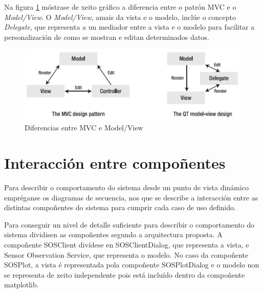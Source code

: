Na figura \ref{fig:MVCvsMV} móstrase de xeito gráfico a diferencia entre o patrón MVC e o \emph{Model/View}. O \emph{Model/View}, amais da vista e o modelo, inclúe o concepto \emph{Delegate}, que representa a un mediador entre a vista e o modelo para facilitar a personalización de como se mostran e editan determinados datos.

\begin{figure}[hbtp]
 \centering
 \includegraphics[width=\textwidth]{images/MVCvsMV.png}
 \caption{Diferencias entre MVC e Model/View}
 \label{fig:MVCvsMV}
\end{figure}

\section{Interacción entre compoñentes}
Para describir o comportamento do sistema desde un punto de vista dinámico empréganse os diagramas de secuencia, nos que se describe a interacción entre as distintas compoñentes do sistema para cumprir cada caso de uso definido.

Para conseguir un nivel de detalle suficiente para describir o comportamento do sistema dividisen as compoñentes segundo a arquitectura proposta. A compoñente SOSClient divídese en SOSClientDialog, que representa a vista, e Sensor Observation Service, que representa o modelo. No caso da compoñente SOSPlot, a vista é representada pola compoñente SOSPlotDialog e o modelo non se representa de xeito independente pois está incluído dentro da compoñente matplotlib.


